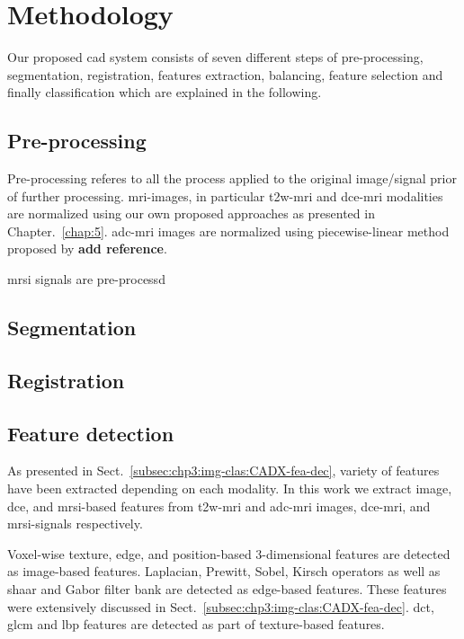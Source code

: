 \section{Methodology}\label{sec:chp6:method}

Our proposed \ac{cad} system consists of seven different steps of pre-processing, segmentation, registration, features extraction, balancing, feature selection and finally classification which are explained in the following.

\subsection{Pre-processing}\label{subsec:chp6:method:PP}
Pre-processing referes to all the process applied to the original image/signal prior of further processing. 
\ac{mri}-images, in particular \ac{t2w}-\ac{mri} and \ac{dce}-\ac{mri} modalities are normalized using our own proposed approaches as presented in Chapter.~\ref{chap:5}.
\ac{adc}-\ac{mri} images are normalized using piecewise-linear method proposed by {\color{red} \textbf{add reference}}.

\ac{mrsi} signals are pre-processd 

\subsection{Segmentation}\label{subsec:chp6:method:Seg}


\subsection{Registration}\label{subsec:chp6:method:Reg}


\subsection{Feature detection}\label{subsec:chp6:method:fea-det}
As presented in Sect.~\ref{subsec:chp3:img-clas:CADX-fea-dec}, variety of features have been extracted depending on each modality.
In this work we extract image, \ac{dce}, and \ac{mrsi}-based features from \ac{t2w}-\ac{mri} and \ac{adc}-\ac{mri} images, \ac{dce}-\ac{mri}, and \ac{mrsi}-signals respectively.

Voxel-wise texture, edge, and position-based 3-dimensional features are detected as image-based features.
Laplacian, Prewitt, Sobel, Kirsch operators as well as {\color{red} shaar} and Gabor filter bank are detected as edge-based features.
These features were extensively discussed in Sect.~\ref{subsec:chp3:img-clas:CADX-fea-dec}.
\ac{dct}, \ac{glcm} and \ac{lbp} features are detected as part of texture-based features.

